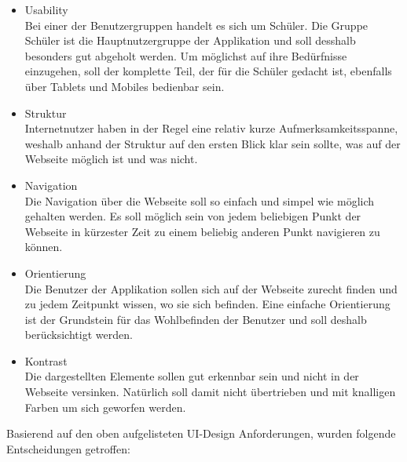 \begin{itemize}
	\item Usability \\
		Bei einer der Benutzergruppen handelt es sich um Schüler. Die Gruppe Schüler ist die Hauptnutzergruppe der Applikation und soll desshalb besonders gut abgeholt werden. Um möglichst auf ihre Bedürfnisse einzugehen, soll der komplette Teil, der für die Schüler gedacht ist, ebenfalls über Tablets und Mobiles bedienbar sein.
		
		
	\item Struktur \\
		Internetnutzer haben in der Regel eine relativ kurze Aufmerksamkeitsspanne, weshalb anhand der Struktur auf den ersten Blick klar sein sollte, was auf der Webseite möglich ist und was nicht. 
		
		
	\item Navigation \\
		Die Navigation über die Webseite soll so einfach und simpel wie möglich gehalten werden. Es soll möglich sein von jedem beliebigen Punkt der Webseite in kürzester Zeit zu einem beliebig anderen Punkt navigieren zu können.
		
	
	\item Orientierung \\
		Die Benutzer der Applikation sollen sich auf der Webseite zurecht finden und zu jedem Zeitpunkt wissen, wo sie sich befinden. Eine einfache Orientierung ist der Grundstein für das Wohlbefinden der Benutzer und soll deshalb berücksichtigt werden.
		
	\item Kontrast \\
		Die dargestellten Elemente sollen gut erkennbar sein und nicht in der Webseite versinken. Natürlich soll damit nicht übertrieben und mit knalligen Farben um sich geworfen werden.
\end{itemize}

Basierend auf den oben aufgelisteten UI-Design Anforderungen, wurden folgende Entscheidungen getroffen:

